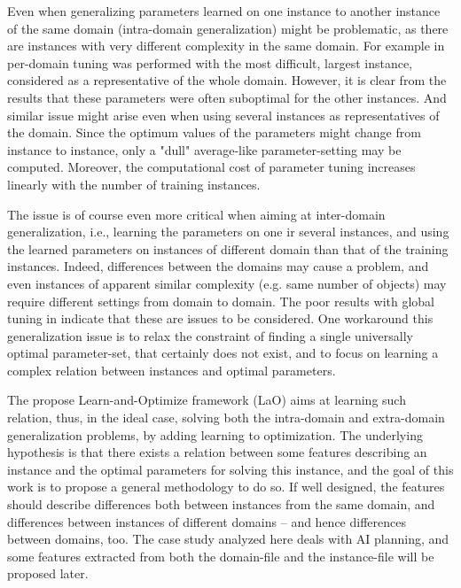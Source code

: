 \documentclass[runningheads,a4paper]{llncs}
\begin{document}
Even when generalizing parameters learned on one instance to another instance of the same domain (intra-domain generalization) might be problematic, as there are instances with very different complexity in the same domain. For example in \cite{BibGECCO:2010} per-domain tuning was performed with the most difficult, largest instance, considered as a representative of the whole domain. However, it is clear from the results that these parameters were often suboptimal for the other instances. And similar issue might arise even when using several instances as representatives of the domain. Since the optimum values of the parameters might change from instance to instance, only a "dull" average-like parameter-setting may be computed. Moreover, the computational cost of parameter tuning increases linearly with the number of training instances. 

The issue is of course even more critical when aiming at inter-domain generalization, i.e., learning the parameters on one ir several instances, and using the learned parameters on instances of different domain than that of the training instances. Indeed, differences between the domains may cause a problem, and even instances of apparent similar complexity (e.g. same number of objects) may require different settings from domain to domain. The poor results with global tuning in \cite{BibGECCO:2010} indicate that these are issues to be considered.
One workaround this generalization issue is to relax the constraint of finding a single universally optimal parameter-set, that certainly does not exist, and to focus on learning a complex relation between instances and optimal parameters. 

The propose Learn-and-Optimize framework (LaO) aims at learning such relation, thus, in the ideal case, solving both the intra-domain and extra-domain generalization problems, by adding learning to optimization. The underlying hypothesis is that there exists a relation between some features describing an instance and the optimal parameters for solving this instance, and the goal of this work is to propose a general methodology to do so. If well designed, the features should describe differences both between instances from the same domain, and differences between instances of different domains -- and hence differences between domains, too. 
The case study analyzed here deals with AI planning, and some features extracted from both the domain-file and the instance-file will be proposed later.
\end{document}
